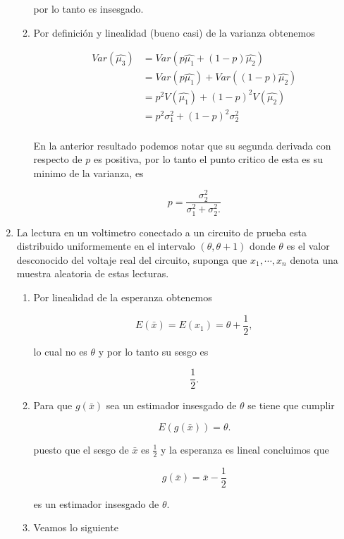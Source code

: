 \documentclass[letterpaper]{article}
\theoremstyle{definition}
\theoremstyle{lemathm}
\theoremstyle{lemademthm}
\begin{document}
\begin{enumerate}
\begin{enumerate}
			por lo tanto es insesgado.

			\item Por definición y linealidad (bueno casi) de la varianza obtenemos
			
			\begin{align*}
				Var(\hat{\mu_3}) &= Var(p\hat{\mu_1} + (1-p)\hat{\mu_2})\\
				&= Var(p\hat{\mu_1}) + Var((1-p)\hat{\mu_2})\\
				&= p^2V(\hat{\mu_1}) + (1-p)^2V(\hat{\mu_2})\\
				&= p^2\sigma_1^2 + (1-p)^2\sigma_2^2\\
			\end{align*}

			En la anterior resultado podemos notar que su segunda derivada con respecto de $p$ es positiva, por lo tanto el punto critico de esta es su minimo de la varianza, es

			\[p = \frac{\sigma_2^2}{\sigma_1^2+\sigma_2^2.}\]

		\end{enumerate}

		\item La lectura en un voltimetro conectado a un circuito de prueba esta distribuido
		uniformemente en el intervalo $(\theta,\theta+1)$ donde $\theta$ es el valor desconocido del voltaje real del circuito, suponga que $x_1,\cdots,x_n$ denota una muestra aleatoria de estas lecturas.

		\begin{enumerate}
			\item Por linealidad de la esperanza obtenemos
			
			\[E(\bar{x}) = E(x_1) = \theta + \frac{1}{2},\]

			lo cual no es $\theta$ y por lo tanto su sesgo es 

			\[\frac{1}{2}.\]

			\item Para que $g(\bar{x})$ sea un estimador insesgado de $\theta$ se tiene que cumplir
			
			\[E(g(\bar{x})) = \theta.\]

			puesto que el sesgo de $\bar{x}$ es $\frac{1}{2}$ y la esperanza es lineal concluimos que

			\[g(\bar{x}) = \bar{x} - \frac{1}{2}\]

			es un estimador insesgado de $\theta$.

			\item Veamos lo siguiente
			

\end{enumerate}
\end{enumerate}
\end{document}
